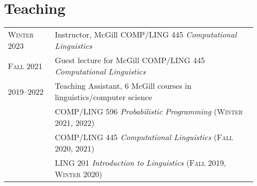 \documentclass[11pt,a4paper]{article}
\begin{document}
  \section{Teaching}
  \begin{longtable}{p{1.7cm}|p{15cm}}
    \textsc{Winter 2023}%
      & Instructor, McGill COMP/LING 445 \emph{Computational Linguistics}\\
    \textsc{Fall 2021}%
      & Guest lecture for McGill COMP/LING 445 \emph{Computational Linguistics}\\
    \textsc{2019--2022}%
      & Teaching Assistant, 6 McGill courses in linguistics/computer science\\
      &\quad COMP/LING 596 \emph{Probabilistic Programming}
            (\textsc{Winter 2021, 2022)}\\
      &\quad COMP/LING 445 \emph{Computational Linguistics}
            (\textsc{Fall 2020, 2021})\\
      &\quad LING 201 \emph{Introduction to Linguistics}
            (\textsc{Fall 2019}, \textsc{Winter 2020})\\
  \end{longtable}
\end{document}
